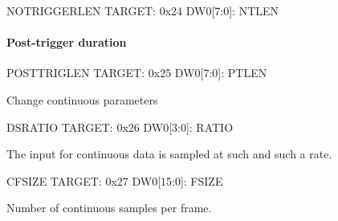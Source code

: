 \begin{dspcmd}{NOTRIGGERLEN}
TARGET: 0x24
DW0[7:0]: NTLEN
\end{dspcmd}

\paragraph{Post-trigger duration}


\begin{dspcmd}{POSTTRIGLEN}
TARGET: 0x25
DW0[7:0]: PTLEN
\end{dspcmd}

Change continuous parameters

\begin{dspcmd}{DSRATIO}
TARGET: 0x26
DW0[3:0]: RATIO
\end{dspcmd}
The input for continuous data is sampled at such and such a rate. 


\begin{dspcmd}{CFSIZE}
TARGET: 0x27
DW0[15:0]: FSIZE
\end{dspcmd}

Number of continuous samples per frame.




